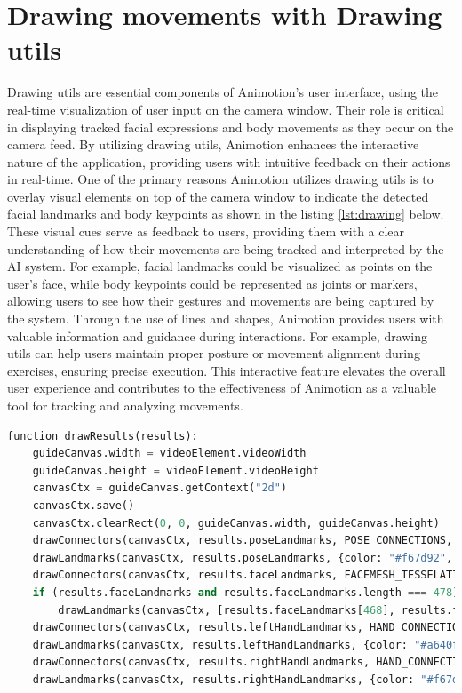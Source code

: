 \section{Drawing movements with Drawing utils}
Drawing utils are essential components of Animotion's user interface, using the real-time visualization of user 
input on the camera window. Their role is critical in displaying tracked facial expressions and body movements as 
they occur on the camera feed. By utilizing drawing utils, Animotion enhances the interactive nature of the 
application, providing users with intuitive feedback on their actions in real-time.
One of the primary reasons Animotion utilizes drawing utils is to overlay visual elements on top of the camera window to 
indicate the detected facial landmarks and body keypoints as shown in the listing \ref{lst:drawing} below. These visual cues serve as feedback to users, 
providing them with a clear understanding of how their movements are being tracked and interpreted by the AI system. 
For example, facial landmarks could be visualized as points on the user's face, while body keypoints could be 
represented as joints or markers, allowing users to see how their gestures and movements are being captured by the system.
Through the use of lines and shapes, Animotion provides users with valuable information and guidance during interactions. 
For example, drawing utils can help users maintain proper posture or movement alignment during exercises, ensuring precise execution. 
This interactive feature elevates the overall user experience and contributes to the effectiveness of 
Animotion as a valuable tool for tracking and analyzing movements. \cite{drawingutils}

\begin{lstlisting}[language=Python,caption=Setting the landmarks on the camera feed,label=lst:drawing]
  function drawResults(results):
    guideCanvas.width = videoElement.videoWidth
    guideCanvas.height = videoElement.videoHeight
    canvasCtx = guideCanvas.getContext("2d")
    canvasCtx.save()
    canvasCtx.clearRect(0, 0, guideCanvas.width, guideCanvas.height)
    drawConnectors(canvasCtx, results.poseLandmarks, POSE_CONNECTIONS, {color: "#a640ff", lineWidth: 4})
    drawLandmarks(canvasCtx, results.poseLandmarks, {color: "#f67d92", lineWidth: 2})
    drawConnectors(canvasCtx, results.faceLandmarks, FACEMESH_TESSELATION, {color: "#fcd4db", lineWidth: 1})
    if (results.faceLandmarks and results.faceLandmarks.length === 478):
        drawLandmarks(canvasCtx, [results.faceLandmarks[468], results.faceLandmarks[468 + 5]], {color: "#fcd4db", lineWidth: 2})
    drawConnectors(canvasCtx, results.leftHandLandmarks, HAND_CONNECTIONS, {color: "#FF1493", lineWidth: 5})
    drawLandmarks(canvasCtx, results.leftHandLandmarks, {color: "#a640ff", lineWidth: 2})
    drawConnectors(canvasCtx, results.rightHandLandmarks, HAND_CONNECTIONS, {color: "#a640ff", lineWidth: 5})
    drawLandmarks(canvasCtx, results.rightHandLandmarks, {color: "#f67d92", lineWidth: 2})
\end{lstlisting}

